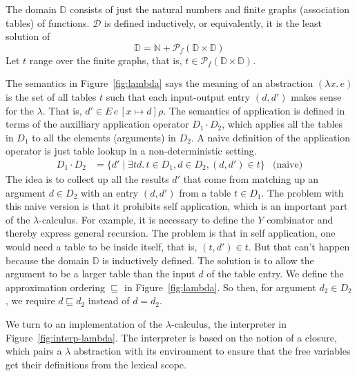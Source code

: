 \documentclass{tufte-handout}
\newcommand{\LAM}[1]{\lambda #1.\,}
\begin{document}
The domain $\mathbb{D}$ consists of just the natural numbers and
finite graphs (association tables) of functions.  $\mathcal{D}$ is
defined inductively, or equivalently, it is the least solution of
\[
   \mathbb{D} = \mathbb{N} + \mathcal{P}_f(\mathbb{D} \times \mathbb{D})
\]
Let $t$ range over the finite graphs, that is, 
$t \in \mathcal{P}_f(\mathbb{D} \times \mathbb{D})$.

The semantics in Figure~\ref{fig:lambda} says the meaning of an
abstraction $(\LAM{x}e)$ is the set of all tables $t$ such that each
input-output entry $(d,d')$ makes sense for the $\lambda$. That is,
$d' \in E\,e\,[x\mapsto d]\rho$. The semantics of application is
defined in terms of the auxilliary application operator $D_1 \cdot
D_2$, which applies all the tables in $D_1$ to all the elements
(arguments) in $D_2$. A naive definition of the application operator
is just table lookup in a non-deterministic setting.
\begin{align*}
  D_1 \cdot D_2 &= 
  \{ d' \mid
  \exists t d.\, t \in D_1, d \in D_2, 
    (d,d') \in t
  \}
  & \text{(naive)}
\end{align*}
The idea is to collect up all the results $d'$ that come from matching
up an argument $d \in D_2$ with an entry $(d,d')$ from a table $t \in
D_1$. The problem with this naive version is that it prohibits self
application, which is an important part of the $\lambda$-calculus.
For example, it is necessary to define the $Y$ combinator and thereby
express general recursion. The problem is that in self application,
one would need a table to be inside itself, that is, $(t,d') \in t$.
But that can't happen because the domain $\mathbb{D}$ is inductively
defined. The solution is to allow the argument to be a larger table
than the input $d$ of the table entry. We define the approximation
ordering $\sqsubseteq$ in Figure~\ref{fig:lambda}.  So then, for
argument $d_2 \in D_2$, we require $d \sqsubseteq d_2$ instead of $d =
d_2$.

We turn to an implementation of the $\lambda$-calculus, the
interpreter in Figure~\ref{fig:interp-lambda}. The interpreter is
based on the notion of a closure, which pairs a $\lambda$ abstraction
with its environment to ensure that the free variables get their
definitions from the lexical scope.
\end{document}

